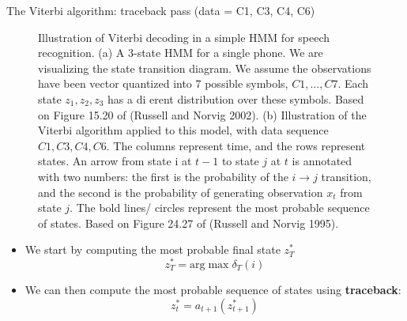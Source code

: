\documentclass[10pt,mathserif]{beamer}
\begin{document}
\begin{frame}{The Viterbi algorithm: traceback pass (data = C1, C3, C4, C6)}
\begin{figure}[h]
\centering     %
{}
\caption{Illustration of Viterbi decoding in a simple HMM for speech recognition. (a) A 3-state HMM for a single phone. We are visualizing the state transition diagram. We assume the observations have been vector quantized into 7 possible symbols, $C1,..., C7$. Each state $z_1 , z_2 , z_3$ has a di erent distribution over these symbols. Based on Figure 15.20 of (Russell and Norvig 2002). (b) Illustration of the Viterbi algorithm applied to this model, with data sequence $C1, C3, C4, C6$. The columns represent time, and the rows represent states. An arrow from state i at $t - 1$ to state $j$ at $t$ is annotated with two numbers: the first is the probability of the $i \rightarrow j$ transition, and the second is the probability of generating observation $x_t$ from state $j$. The bold lines/ circles represent the most probable sequence of states. Based on Figure 24.27 of (Russell and Norvig 1995).}
\end{figure}


\begin{itemize}
    \item We start by computing the most probable final state $z_T^*$
    \begin{equation}
        z_T^* =\text{arg}\max\delta_T(i)
    \end{equation}

    \item We can then compute the most probable sequence of states using \textbf{traceback}:
    \begin{equation}
        z_t^* = a_{t+1}(z_{t+1}^*)
    \end{equation}
    

\end{itemize}
\end{frame}
\end{document}
